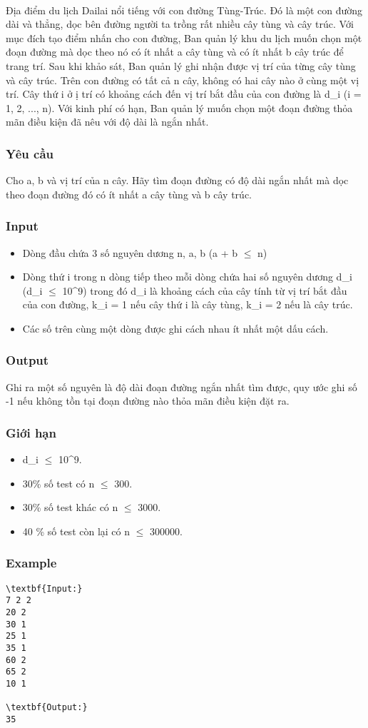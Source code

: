 

 

Địa điểm du lịch Dailai nổi tiếng với con đường Tùng-Trúc. Đó là một con đường dài và thẳng, dọc bên đường người ta trồng rất nhiều cây tùng và cây trúc. Với mục đích tạo điểm nhấn cho con đường, Ban quản lý khu du lịch muốn chọn một đoạn đường mà dọc theo nó có ít nhất a cây tùng và có ít nhất b cây trúc để trang trí. Sau khi khảo sát, Ban quản lý ghi nhận được vị trí của từng cây tùng và cây trúc. Trên con đường có tất cả n cây, không có hai cây nào ở cùng một vị trí. Cây thứ i ở ị trí có khoảng cách đến vị trí bắt đầu của con đường là d\_i (i = 1, 2, ..., n). Với kinh phí có hạn, Ban quản lý muốn chọn một đoạn đường thỏa mãn điều kiện đã nêu với độ dài là ngắn nhất.

\subsubsection{Yêu cầu}

Cho a, b và vị trí của n cây. Hãy tìm đoạn đường có độ dài ngắn nhất mà dọc theo đoạn đường đó có ít nhất a cây tùng và b cây trúc.

\subsubsection{Input}
\begin{itemize}
	\item Dòng đầu chứa 3 số nguyên dương n, a, b (a + b  $\le$  n)
	\item Dòng thứ i trong n dòng tiếp theo mỗi dòng chứa hai số nguyên dương d\_i (d\_i  $\le$  10\textasciicircum9) trong đó d\_i là khoảng cách của cây tính từ vị trí bắt đầu của con đường, k\_i = 1 nếu cây thứ i là cây tùng, k\_i = 2 nếu là cây trúc.
	\item Các số trên cùng một dòng được ghi cách nhau ít nhất một dấu cách.
\end{itemize}

\subsubsection{Output}

Ghi ra một số nguyên là độ dài đoạn đường ngắn nhất tìm được, quy ước ghi số -1 nếu không tồn tại đoạn đường nào thỏa mãn điều kiện đặt ra.

\subsubsection{Giới hạn}
\begin{itemize}
	\item d\_i  $\le$  10\textasciicircum9.
	\item 30\% số test có n  $\le$  300.
	\item 30\% số test khác có n  $\le$  3000.
	\item 40 \% số test còn lại có n  $\le$  300000.
\end{itemize}

\subsubsection{Example}
\begin{verbatim}
\textbf{Input:}
7 2 2
20 2
30 1
25 1
35 1
60 2
65 2
10 1

\textbf{Output:}
35\end{verbatim}
